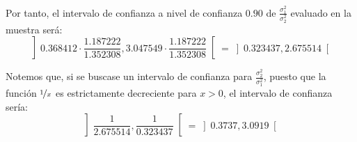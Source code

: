 \begin{ejercicio}
    Por tanto, el intervalo de confianza a nivel de confianza $0.90$ de $\frac{\sigma_1^2}{\sigma_2^2}$ evaluado en la muestra será:
    \begin{equation*}
        \left]0.368412\cdot \frac{1.187222}{1.352308}, 3.047549\cdot \frac{1.187222}{1.352308}\right[ = \left]0.323437, 2.675514\right[
    \end{equation*}

    Notemos que, si se buscase un intervalo de confianza para $\frac{\sigma_2^2}{\sigma_1^2}$, puesto que la función $\nicefrac{1}{x}$ es estrictamente decreciente para $x>0$, el intervalo de confianza sería:
    \begin{equation*}
        \left]\frac{1}{2.675514}, \frac{1}{0.323437}\right[ = \left]0.3737, 3.0919\right[
    \end{equation*}
\end{ejercicio}

